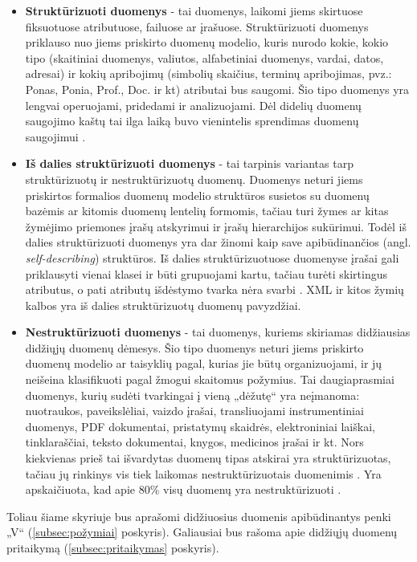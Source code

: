\documentclass{VUMIFPSkursinis}
\begin{document}
\begin{itemize}
\item \textbf{Struktūrizuoti duomenys} - tai duomenys, laikomi jiems skirtuose fiksuotuose atributuose, failuose ar įrašuose. Struktūrizuoti duomenys priklauso nuo jiems priskirto duomenų modelio, kuris nurodo kokie, kokio tipo (skaitiniai duomenys, valiutos, alfabetiniai duomenys, vardai, datos, adresai) ir kokių apribojimų (simbolių skaičius, terminų apribojimas, pvz.: Ponas, Ponia, Prof., Doc. ir kt) atributai bus saugomi. Šio tipo duomenys yra lengvai operuojami, pridedami ir analizuojami. Dėl didelių duomenų saugojimo kaštų tai ilga laiką buvo vienintelis sprendimas duomenų saugojimui \cite{structured_data}.

\item \textbf{Iš dalies struktūrizuoti duomenys} \cite{semistructured_data} - tai tarpinis variantas tarp struktūrizuotų ir nestruktūrizuotų duomenų. Duomenys neturi jiems priskirtos formalios duomenų modelio struktūros susietos su duomenų bazėmis ar kitomis duomenų lentelių formomis, tačiau turi žymes ar kitas žymėjimo priemones įrašų atskyrimui ir įrašų hierarchijos sukūrimui. Todėl iš dalies struktūrizuoti duomenys yra dar žinomi kaip save apibūdinančios (angl. \textit{self-describing}) struktūros. Iš dalies struktūrizuotuose duomenyse įrašai gali priklausyti vienai klasei ir būti grupuojami kartu, tačiau turėti skirtingus atributus, o pati atributų išdėstymo tvarka nėra svarbi \cite{structured_data}. XML ir kitos žymių kalbos yra iš dalies struktūrizuotų duomenų pavyzdžiai.

\item \textbf{Nestruktūrizuoti duomenys} - tai duomenys, kuriems skiriamas didžiausias didžiųjų duomenų dėmesys. Šio tipo duomenys neturi jiems priskirto duomenų modelio ar taisyklių pagal, kurias jie būtų organizuojami, ir jų neišeina klasifikuoti pagal žmogui skaitomus požymius. Tai daugiaprasmiai duomenys, kurių sudėti tvarkingai į vieną „dėžutę“ yra neįmanoma: nuotraukos, paveikslėliai, vaizdo įrašai, transliuojami instrumentiniai duomenys, PDF dokumentai, pristatymų skaidrės, elektroniniai laiškai, tinklaraščiai, teksto dokumentai, knygos, medicinos įrašai ir kt. Nors kiekvienas prieš tai išvardytas duomenų tipas atskirai yra struktūrizuotas, tačiau jų rinkinys vis tiek laikomas nestruktūrizuotais duomenimis \cite{structured_data}. Yra apskaičiuota, kad apie 80\% visų duomenų yra nestruktūrizuoti \cite{unstructured}.
\end{itemize} 

Toliau šiame skyriuje bus aprašomi didžiuosius duomenis apibūdinantys penki „V“ (\ref{subsec:požymiai} poskyris). Galiausiai bus rašoma apie didžiųjų duomenų pritaikymą (\ref{subsec:pritaikymas} poskyris).
\end{document}
